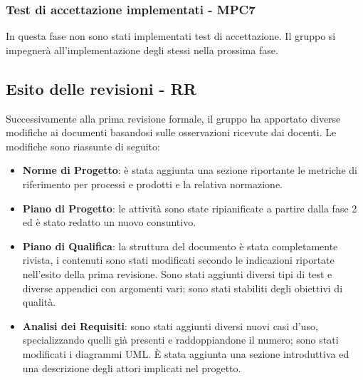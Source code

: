\subsubsection{Test di accettazione implementati - MPC7}
In questa fase non sono stati implementati test di accettazione.
Il gruppo si impegnerà all'implementazione degli stessi nella prossima fase.
\newpage
\subsection{Esito delle revisioni - RR}
Successivamente alla prima revisione formale, il gruppo ha apportato diverse modifiche ai documenti basandosi sulle osservazioni ricevute dai docenti. Le modifiche sono riassunte di seguito:
	\begin{itemize}
		\item \textbf{Norme di Progetto}: è stata aggiunta una sezione riportante le metriche di riferimento per processi e prodotti e la relativa normazione. 
		\item \textbf{Piano di Progetto}: le attività sono state ripianificate a partire dalla fase 2 ed è stato redatto un nuovo consuntivo.
		\item \textbf{Piano di Qualifica}: la struttura del documento è stata completamente rivista, i contenuti sono stati modificati secondo le indicazioni riportate nell'esito della prima revisione. Sono stati aggiunti diversi tipi di test e diverse appendici con argomenti vari; sono stati stabiliti degli obiettivi di qualità.
		\item \textbf{Analisi dei Requisiti}: sono stati aggiunti diversi nuovi casi d'uso, specializzando quelli già presenti e raddoppiandone il numero; sono stati modificati i diagrammi UML. \`E stata aggiunta una sezione introduttiva ed una descrizione degli attori implicati nel progetto. 
	\end{itemize}

